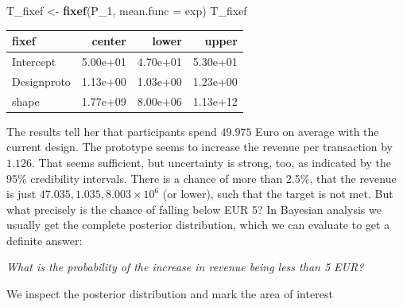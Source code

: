 \documentclass[]{svmono}
\newenvironment{Shaded}{\begin{snugshade}}{\end{snugshade}}
\newcommand{\KeywordTok}[1]{\textcolor[rgb]{0.13,0.29,0.53}{\textbf{#1}}}
\newcommand{\DataTypeTok}[1]{\textcolor[rgb]{0.13,0.29,0.53}{#1}}
\newcommand{\DecValTok}[1]{\textcolor[rgb]{0.00,0.00,0.81}{#1}}
\newcommand{\StringTok}[1]{\textcolor[rgb]{0.31,0.60,0.02}{#1}}
\newcommand{\OperatorTok}[1]{\textcolor[rgb]{0.81,0.36,0.00}{\textbf{#1}}}
\newcommand{\NormalTok}[1]{#1}
\theoremstyle{definition}
\theoremstyle{definition}
\theoremstyle{definition}
\theoremstyle{remark}
\begin{document}
\begin{Shaded}
\end{Shaded}

\begin{Shaded}
\begin{Highlighting}[]
\NormalTok{T_fixef <-}\StringTok{ }\KeywordTok{fixef}\NormalTok{(P_}\DecValTok{1}\NormalTok{, }\DataTypeTok{mean.func =}\NormalTok{ exp)}
\NormalTok{T_fixef}
\end{Highlighting}
\end{Shaded}

\begin{longtable}[]{@{}lrrr@{}}
\toprule
fixef & center & lower & upper\tabularnewline
\midrule
\endhead
Intercept & 5.00e+01 & 4.70e+01 & 5.30e+01\tabularnewline
Designproto & 1.13e+00 & 1.03e+00 & 1.23e+00\tabularnewline
shape & 1.77e+09 & 8.00e+06 & 1.13e+12\tabularnewline
\bottomrule
\end{longtable}

The results tell her that participants spend \(49.975\) Euro on average
with the current design. The prototype seems to increase the revenue per
transaction by \(1.126\). That seems sufficient, but uncertainty is
strong, too, as indicated by the 95\% credibility intervals. There is a
chance of more than 2.5\%, that the revenue is just
\(47.035, 1.035, 8.003\times 10^{6}\) (or lower), such that the target
is not met. But what precisely is the chance of falling below EUR 5? In
Bayesian analysis we usually get the complete posterior distribution,
which we can evaluate to get a definite answer:

\emph{What is the probability of the increase in revenue being less than
5 EUR?}

We inspect the posterior distribution and mark the area of interest
\end{document}
